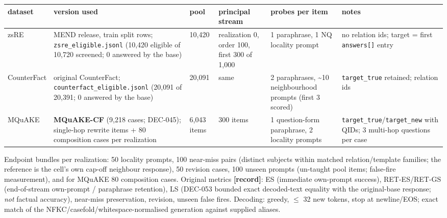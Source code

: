 \documentclass[10pt,a4paper]{article}
\begin{document}
\begin{center}\footnotesize
\begin{tabularx}{\textwidth}{@{}p{}XXXXX@{}}
\toprule
dataset & version used & pool & principal stream & probes per item & notes \\ \midrule
zsRE & MEND release, train split rows; \texttt{zsre\_eligible.jsonl} (10,420 eligible of 10,720 screened; 0 answered by the base) & 10,420 & realization 0, order 100, first 300 of 1,000 & 1 paraphrase, 1 NQ locality prompt & no relation ids; target = first \texttt{answers[]} entry \\
CounterFact & original CounterFact; \texttt{counterfact\_eligible.jsonl} (20,091 of 20,391; 0 answered by the base) & 20,091 & same & 2 paraphrases, \textasciitilde{}10 neighbourhood prompts (first 3 scored) & \texttt{target\_true} retained; relation ids \\
MQuAKE & \textbf{MQuAKE-CF} (9,218 cases; DEC-045); single-hop rewrite items + 80 composition cases per realization & 6,043 items & 300 items & 1 question-form paraphrase, 2 locality prompts & \texttt{target\_true}/\texttt{target\_new} with QIDs; 3 multi-hop questions per case \\
\bottomrule
\end{tabularx}
\end{center}



Endpoint bundles per realization: 50 locality prompts, 100 near-miss pairs (distinct subjects within matched relation/template families; the reference is the cell's own cap-off neighbour response), 50 revision cases, 100 unseen prompts (un-taught pool items; false-fire measurement), and for MQuAKE 80 composition cases. Original metrics \textbf{[record]}: ES (immediate own-prompt success), RET-ES/RET-GS (end-of-stream own-prompt / paraphrase retention), LS (DEC-053 bounded exact decoded-text equality with the original-base response; \emph{not} factual accuracy), near-miss preservation, revision, unseen false fires. Decoding: greedy, $\le$ 32 new tokens, stop at newline/EOS; exact match of the NFKC/casefold/whitespace-normalised generation against supplied aliases.
\end{document}
